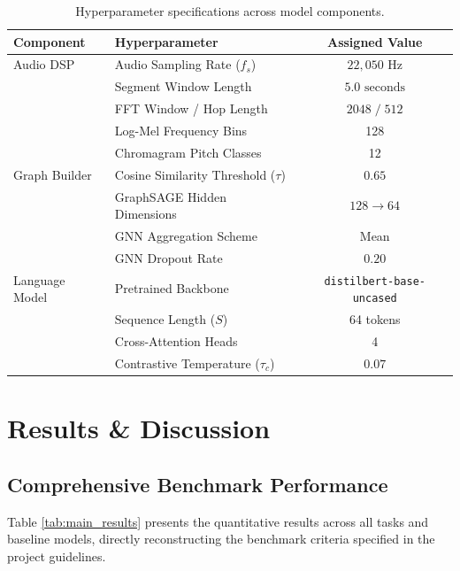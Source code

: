 \documentclass{article}
\begin{document}
\begin{table}[h]
\centering
\caption{Hyperparameter specifications across model components.}
\label{tab:hyperparams}
\begin{tabular}{llc}
\toprule
\textbf{Component} & \textbf{Hyperparameter} & \textbf{Assigned Value} \\
\midrule
Audio DSP & Audio Sampling Rate ($f_s$) & $22,050\text{ Hz}$ \\
& Segment Window Length & $5.0\text{ seconds}$ \\
& FFT Window / Hop Length & $2048 \;/\; 512$ \\
& Log-Mel Frequency Bins & 128 \\
& Chromagram Pitch Classes & 12 \\
\midrule
Graph Builder & Cosine Similarity Threshold ($\tau$) & $0.65$ \\
& GraphSAGE Hidden Dimensions & $128 \rightarrow 64$ \\
& GNN Aggregation Scheme & Mean \\
& GNN Dropout Rate & $0.20$ \\
\midrule
Language Model & Pretrained Backbone & \texttt{distilbert-base-uncased} \\
& Sequence Length ($S$) & 64 tokens \\
& Cross-Attention Heads & 4 \\
& Contrastive Temperature ($\tau_c$) & $0.07$ \\
\bottomrule
\end{tabular}
\end{table}

\section{Results \& Discussion}
\label{sec:results}

\subsection{Comprehensive Benchmark Performance}
Table \ref{tab:main_results} presents the quantitative results across all tasks and baseline models, directly reconstructing the benchmark criteria specified in the project guidelines.
\end{document}
